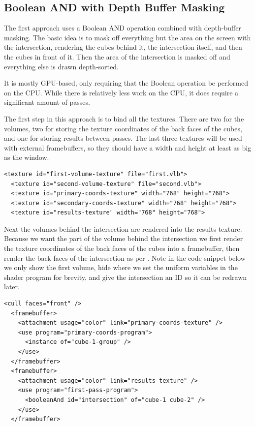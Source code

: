 \documentclass{article}
\begin{document}
\subsection{Boolean AND with Depth Buffer Masking}

The first approach uses a Boolean AND operation combined with depth-buffer
masking.  The basic idea is to mask off everything but the area on the screen
with the intersection, rendering the cubes behind it, the intersection itself,
and then the cubes in front of it.  Then the area of the intersection is masked
off and everything else is drawn depth-sorted.

It is mostly GPU-based, only requiring that the Boolean operation be performed
on the CPU.  While there is relatively less work on the CPU, it does require a
significant amount of passes.

The first step in this approach is to bind all the textures.  There are two for
the volumes, two for storing the texture coordinates of the back faces of the
cubes, and one for storing results between passes.  The last three textures will
be used with external framebuffers, so they should have a width and height at
least as big as the window.

\begin{Verbatim}[fontsize=\small]
  <texture id="first-volume-texture" file="first.vlb">
  <texture id="second-volume-texture" file="second.vlb">
  <texture id="primary-coords-texture" width="768" height="768">
  <texture id="secondary-coords-texture" width="768" height="768">
  <texture id="results-texture" width="768" height="768">
\end{Verbatim}

Next the volumes behind the intersection are rendered into the results texture.
Because we want the part of the volume behind the intersection we first render
the texture coordinates of the back faces of the cubes into a framebuffer, then
render the back faces of the intersection as per \cite{Kruger03}.  Note in the code
snippet below we only show the first volume, hide where we set the uniform
variables in the shader program for brevity, and give the intersection an ID so
it can be redrawn later.

\begin{Verbatim}[fontsize=\small]
  <cull faces="front" />
  <framebuffer>
    <attachment usage="color" link="primary-coords-texture" />
    <use program="primary-coords-program">
      <instance of="cube-1-group" />
    </use>
  </framebuffer>
  <framebuffer>
    <attachment usage="color" link="results-texture" />
    <use program="first-pass-program">
      <booleanAnd id="intersection" of="cube-1 cube-2" />
    </use>
  </framebuffer>
\end{Verbatim}
\end{document}
